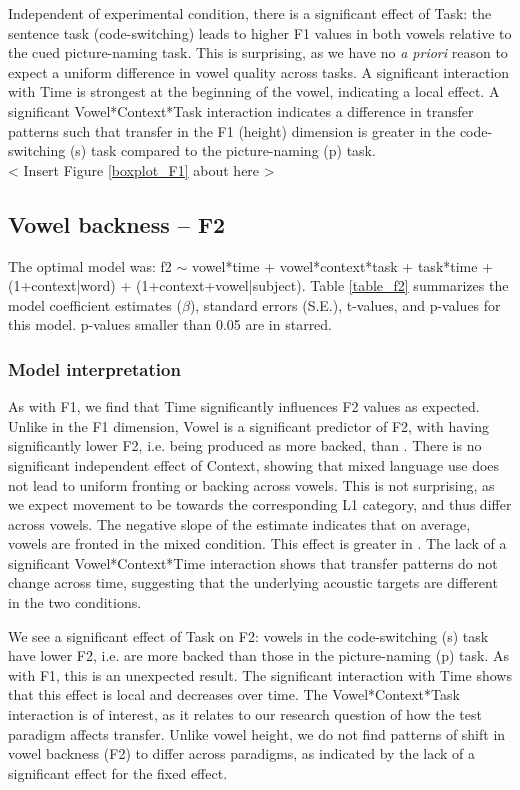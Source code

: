 \documentclass[12 pt]{article}
\newcommand{\nt}[1]{\textipa{[#1]}} %
\begin{document}
Independent of experimental condition, there is a significant effect of Task: the sentence task (code-switching) leads to higher F1 values in both vowels relative to the cued picture-naming task. This is surprising, as we have no \textit{a priori} reason to expect a uniform difference in vowel quality across tasks. A significant interaction with Time is strongest at the beginning of the vowel, indicating a local effect. A significant Vowel*Context*Task interaction indicates a difference in transfer patterns such that transfer in the F1 (height) dimension is greater in the code-switching (s) task compared to the picture-naming (p) task.\\


< Insert Figure \ref{boxplot_F1} about here >\\


\subsection{Vowel backness -- F2}
The optimal model was: f2 $\sim$ vowel*time + vowel*context*task + task*time + (1+context|word) + (1+context+vowel|subject). Table \ref{table_f2} summarizes the model coefficient estimates ($\beta$), standard errors (S.E.), t-values, and p-values for this model. p-values smaller than 0.05 are in starred.



\subsubsection*{Model interpretation}

As with F1, we find that Time significantly influences F2 values as expected. Unlike in the F1 dimension, Vowel is a significant predictor of F2, with \nt{2} having significantly lower F2, i.e. being produced as more backed, than \nt{\ae}. There is no significant independent effect of Context, showing that mixed language use does not lead to uniform fronting or backing across vowels. This is not surprising, as we expect movement to be towards the corresponding L1 category, and thus differ across vowels. The negative slope of the estimate indicates that on average, vowels are fronted in the mixed condition. This effect is greater in \nt{\ae}. The lack of a significant Vowel*Context*Time interaction shows that transfer patterns do not change across time, suggesting that the underlying acoustic targets are different in the two conditions.
 
We see a significant effect of Task on F2: vowels in the code-switching (s) task have lower F2, i.e. are more backed than those in the picture-naming (p) task. As with F1, this is an unexpected result. The significant interaction with Time shows that this effect is local and decreases over time. The Vowel*Context*Task interaction is of interest, as it relates to our research question of how the test paradigm affects transfer. Unlike vowel height, we do not find patterns of shift in vowel backness (F2) to differ across paradigms, as indicated by the lack of a significant effect for the fixed effect. 
\end{document}
